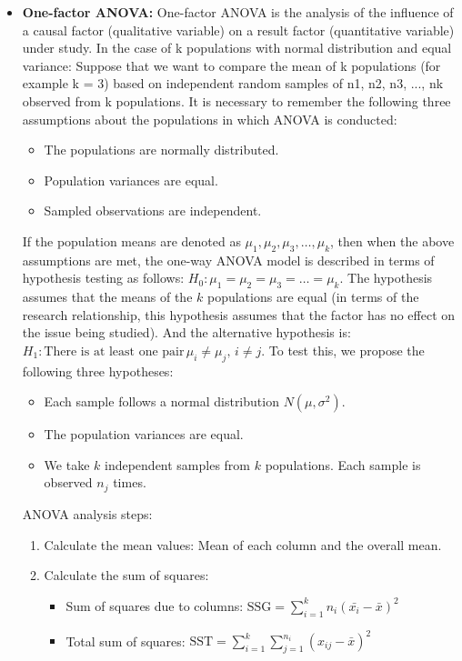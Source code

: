 \documentclass{article}
\begin{document}
	\begin{itemize}
		\item 
		\textbf{One-factor ANOVA:} One-factor ANOVA is the analysis of the influence of a causal factor (qualitative variable) on a result factor (quantitative variable) under study. In the case of k populations with normal distribution and equal variance: Suppose that we want to compare the mean of k populations (for example k = 3) based on independent random samples of n1, n2, n3, ..., nk observed from k populations. It is necessary to remember the following three assumptions about the populations in which ANOVA is conducted:
		\begin{itemize}
			\item The populations are normally distributed.
			\item Population variances are equal.
			\item Sampled observations are independent.
		\end{itemize}
		If the population means are denoted as \(\mu_1, \mu_2, \mu_3, \ldots, \mu_k\), then when the above assumptions are met, the one-way ANOVA model is described in terms of hypothesis testing as follows: \(H_0: \mu_1 = \mu_2 = \mu_3 = \ldots = \mu_k\). The hypothesis assumes that the means of the \(k\) populations are equal (in terms of the research relationship, this hypothesis assumes that the factor has no effect on the issue being studied). And the alternative hypothesis is: \(H_1: \text{There is at least one pair} \, \mu_i \neq \mu_j, \, i \neq j\). To test this, we propose the following three hypotheses:
		\begin{itemize}
			\item Each sample follows a normal distribution \( N(\mu, \sigma^2) \).
			\item The population variances are equal.
			\item We take \( k \) independent samples from \( k \) populations. Each sample is observed \( n_j \) times.
		\end{itemize}
		ANOVA analysis steps:
		\begin{enumerate}
			\item Calculate the mean values: Mean of each column and the overall mean.
			\item Calculate the sum of squares:
			\begin{itemize}
				\item Sum of squares due to columns: \( \text{SSG} = \sum_{i=1}^k n_i (\bar{x_i} - \bar{x})^2 \)
				\item Total sum of squares: \( \text{SST} = \sum_{i=1}^k \sum_{j=1}^{n_i} (x_{ij} - \bar{x})^2 \)

\end{itemize}
\end{enumerate}
\end{itemize}
\end{document}
